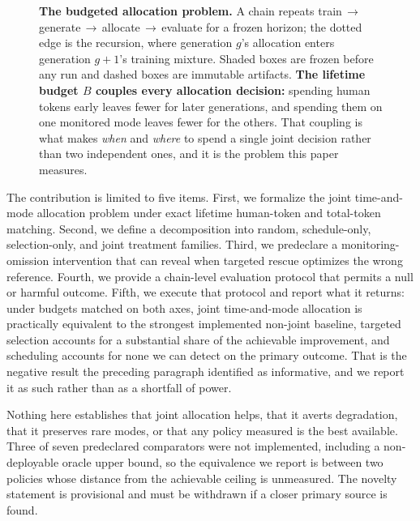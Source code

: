 \begin{figure}[t]
\centering

\caption{\textbf{The budgeted allocation problem.} A chain repeats
train\,$\rightarrow$\,generate\,$\rightarrow$\,allocate\,$\rightarrow$\,evaluate for a
frozen horizon; the dotted edge is the recursion, where generation $g$'s allocation enters
generation $g{+}1$'s training mixture. Shaded boxes are frozen before any run and dashed
boxes are immutable artifacts. \textbf{The lifetime budget $B$ couples every allocation
decision:} spending human tokens early leaves fewer for later generations, and spending
them on one monitored mode leaves fewer for the others. That coupling is what makes
\emph{when} and \emph{where} to spend a single joint decision rather than two independent
ones, and it is the problem this paper measures.}
\label{fig:pipeline}
\end{figure}

The contribution is limited to five items. First, we formalize the joint time-and-mode allocation problem under exact lifetime human-token and total-token matching. Second, we define a decomposition into random, schedule-only, selection-only, and joint treatment families. Third, we predeclare a monitoring-omission intervention that can reveal when targeted rescue optimizes the wrong reference. Fourth, we provide a chain-level evaluation protocol that permits a null or harmful outcome. Fifth, we execute that protocol and report what it returns: under budgets matched on both axes, joint time-and-mode allocation is practically equivalent to the strongest implemented non-joint baseline, targeted selection accounts for a substantial share of the achievable improvement, and scheduling accounts for none we can detect on the primary outcome. That is the negative result the preceding paragraph identified as informative, and we report it as such rather than as a shortfall of power.

Nothing here establishes that joint allocation helps, that it averts degradation, that it preserves rare modes, or that any policy measured is the best available. Three of seven predeclared comparators were not implemented, including a non-deployable oracle upper bound, so the equivalence we report is between two policies whose distance from the achievable ceiling is unmeasured. The novelty statement is provisional and must be withdrawn if a closer primary source is found.
